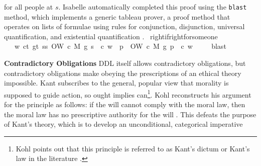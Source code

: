 \begin{isabellebody}
{for all people at $s$. Isabelle automatically completed this proof using the \texttt{blast} method, 
which implements a generic tableau prover, a proof method that operates on lists of formulae using 
rules for conjunction, disjunction, universal quantification, and existential quantification \citep{blast}.%
}%
\endisatagproof
{\isafoldproof}%
%
\isadelimproof
\isanewline
%
\endisadelimproof
\isanewline
{}\isamarkupfalse%
\ right{\isacharunderscore}if{\isacharunderscore}right{\isacharunderscore}for{\isacharunderscore}someone{\isacharcolon}\isanewline
\ \ \ {\isachardoublequoteopen}{\isasymforall}w{\isachardot}\ {\isasymforall}c{\isacharcolon}{\isacharcolon}t{\isachardot}\ {\isasymforall}g{\isacharcolon}{\isacharcolon}t{\isachardot}\ {\isasymexists}s{\isacharcolon}{\isacharcolon}s{\isachardot}\ O{\isacharbraceleft}W\ {\isacharparenleft}c{\isacharcomma}\ M{\isacharcomma}\ g{\isacharparenright}\ s\ {\isacharbar}\ c{\isacharbraceright}\ w\ {\isasymlongrightarrow}\ {\isacharparenleft}{\isasymforall}p{\isachardot}\ \ O{\isacharbraceleft}W\ {\isacharparenleft}c{\isacharcomma}\ M{\isacharcomma}\ g{\isacharparenright}\ p\ {\isacharbar}\ c{\isacharbraceright}\ w{\isacharparenright}\ {\isachardoublequoteclose}\isanewline
%
\isadelimproof
\ \ %
\endisadelimproof
%
\isatagproof
{}\isamarkupfalse%
\ blast\isanewline
%
%
\endisatagproof
{\isafoldproof}%
%
\isadelimproof
%
\endisadelimproof
%
\begin{isamarkuptext}%
\noindent \textbf{Contradictory Obligations} DDL itself allows contradictory obligations, but contradictory obligations
make obeying the prescriptions of an ethical theory impossible.
Kant subscribes to the general, popular view that morality is supposed to guide action, so ought implies 
can\footnote{Kohl points out that this principle is referred to as 
Kant's dictum or Kant's law in the literature \citep[footnote 1]{kohl}.}. Kohl reconstructs his argument for the principle as 
follows: if the will cannot comply with the moral law, then the moral law has no prescriptive authority 
for the will \citep[703-4]{kohl}. This defeats the purpose of Kant's theory, which is to develop an unconditional, categorical imperative 

\end{isamarkuptext}
\end{isabellebody}
